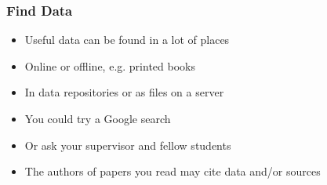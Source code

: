 \documentclass{beamer}
\begin{document}
\begin{frame}
  \frametitle{Find Data}
  
  \begin{itemize}
  \item Useful data can be found in a lot of places
  \item Online or offline, e.g. printed books
  \item In data repositories or as files on a server
  \item You could try a Google search
  \item Or ask your supervisor and fellow students
  \item The authors of papers you read may cite data and/or sources
  \end{itemize}
\end{frame}

{
	\begin{frame}[plain]
	\end{frame}
}
\end{document}
